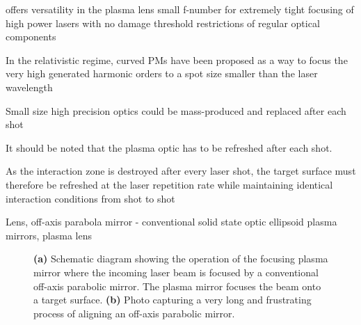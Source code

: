 offers versatility in the plasma lens small f-number for extremely tight focusing of high power lasers with no damage threshold restrictions of regular optical components

In the relativistic regime, curved PMs have been proposed as a way to focus the very high generated harmonic orders to a spot size smaller than the laser wavelength

Small size high precision optics could be mass-produced and replaced after each shot

It should be noted that the plasma optic has to be refreshed after each shot.

As the interaction zone is destroyed after every laser shot, the target surface must therefore be refreshed at the laser repetition rate while maintaining identical interaction conditions from shot to shot

Lens, off-axis parabola mirror - conventional solid state optic
ellipsoid plasma mirrors, plasma lens



\begin{figure}[h!]
	\centering
	\hspace{5mm}
	\caption{\textbf{(a)} Schematic diagram showing the operation of the focusing plasma mirror where the incoming laser beam is focused by a conventional off-axis parabolic mirror. The plasma mirror focuses the beam onto a target surface. \textbf{(b)} Photo capturing a very long and frustrating process of aligning an off-axis parabolic mirror.}
	\label{}
\end{figure}